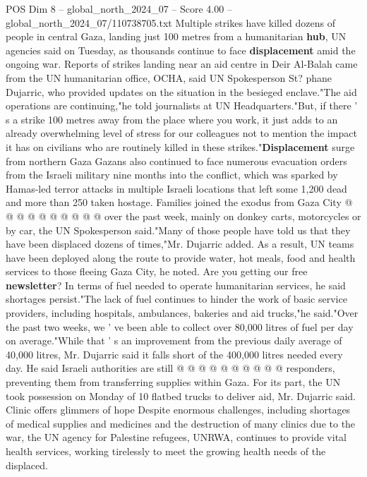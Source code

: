\begin{textsample}{POS Dim 8 – global\_north\_2024\_07 – Score 4.00 – global\_north\_2024\_07/110738705.txt}  \label{ex:f8_pos_264}
Multiple strikes have killed dozens of people in central Gaza, landing just 100 metres from a humanitarian \textbf{hub}, UN agencies said on Tuesday, as thousands continue to face \textbf{displacement} amid the ongoing war.
Reports of strikes landing near an aid centre in Deir Al-Balah came from the UN humanitarian office, OCHA, said UN Spokesperson St? phane Dujarric, who provided updates on the situation in the besieged enclave."The aid operations are continuing,"he told journalists at UN Headquarters."But, if there ' s a strike 100 metres away from the place where you work, it just adds to an already overwhelming level of stress for our colleagues not to mention the impact it has on civilians who are routinely killed in these strikes."\textbf{Displacement} surge from northern Gaza Gazans also continued to face numerous evacuation orders from the Israeli military nine months into the conflict, which was sparked by Hamas-led terror attacks in multiple Israeli locations that left some 1,200 dead and more than 250 taken hostage.
Families joined the exodus from Gaza City @ @ @ @ @ @ @ @ @ @ over the past week, mainly on donkey carts, motorcycles or by car, the UN Spokesperson said."Many of those people have told us that they have been displaced dozens of times,"Mr.
Dujarric added.
As a result, UN teams have been deployed along the route to provide water, hot meals, food and health services to those fleeing Gaza City, he noted.
Are you getting our free \textbf{newsletter}?
In terms of fuel needed to operate humanitarian services, he said shortages persist."The lack of fuel continues to hinder the work of basic service providers, including hospitals, ambulances, bakeries and aid trucks,"he said."Over the past two weeks, we ' ve been able to collect over 80,000 litres of fuel per day on average."While that ' s an improvement from the previous daily average of 40,000 litres, Mr.
Dujarric said it falls short of the 400,000 litres needed every day.
He said Israeli authorities are still @ @ @ @ @ @ @ @ @ @ responders, preventing them from transferring supplies within Gaza.
For its part, the UN took possession on Monday of 10 flatbed trucks to deliver aid, Mr.
Dujarric said.
Clinic offers glimmers of hope Despite enormous challenges, including shortages of medical supplies and medicines and the destruction of many clinics due to the war, the UN agency for Palestine refugees, UNRWA, continues to provide vital health services, working tirelessly to meet the growing health needs of the displaced.

\end{textsample}
